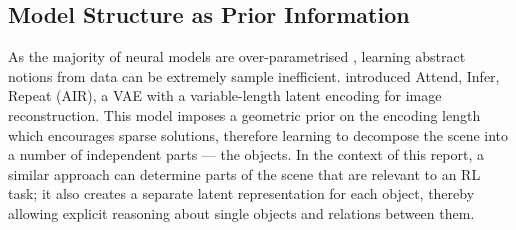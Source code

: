     
  
    \subsection{Model Structure as Prior Information}
        As the majority of neural models are over-parametrised \citep{Denil2013}, learning abstract notions from data can be extremely sample inefficient. \cite{Eslami2016} introduced Attend, Infer, Repeat (AIR), a VAE with a variable-length latent encoding for image reconstruction. 
        This model imposes a geometric prior on the encoding length which encourages sparse solutions, therefore learning to decompose the scene into a number of independent parts --- the objects. 
        In the context of this report, a similar approach can determine parts of the scene that are relevant to an RL task; it also creates a separate latent representation for each object, thereby allowing explicit reasoning about single objects and relations between them.
        
